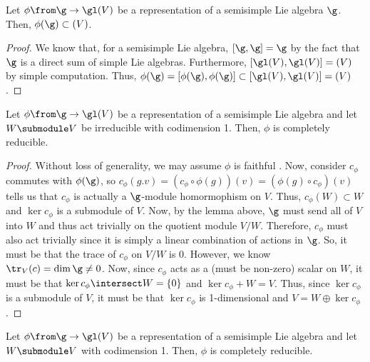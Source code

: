 \documentclass[11pt,leqno,oneside]{amsart}
\numberwithin{thm}{section}
\begin{document}
\begin{lem}\label{trivial-action-on-codim-1}
  Let \(\phi \from \g \to \gl(V)\) be a representation of a semisimple
  Lie algebra \(\g\). Then, \(\phi(\g) \subset \sl(V)\). 
\end{lem}
\begin{proof}
  We know that, for a semisimple Lie algebra, \([\g,\g] = \g\) by the
  fact that \(\g\) is a direct sum of simple Lie
  algebras. Furthermore, \([\gl(V),\gl(V)] = \sl(V)\) by simple
  computation. Thus, \(\phi(\g) = [\phi(\g), \phi(\g)] \subset
  [\gl(V),\gl(V)] = \sl(V)\). 
\end{proof}
\begin{lem}\label{baby-baby-weyl}
  Let \(\phi \from \g \to \gl(V)\) be a representation of a
  semisimple 
  Lie algebra and let \(W \submodule V\) be irreducible with
  codimension 1. Then, \(\phi\) is completely reducible.
\end{lem}
\begin{proof}
  Without loss of generality, we may assume \(\phi\) is faithful
  . Now, consider \(c_\phi\) commutes with \(\phi(\g)\), so
  \(c_\phi(g.v) = (c_\phi \circ \phi(g))(v) = (\phi(g) \circ
  c_\phi)(v)\) tells us that \(c_\phi\) is actually a \(\g\)-module
  homormophism on \(V\). Thus, \(c_\phi(W) \subset W\) and \(\ker
  c_\phi\) is a submodule of \(V\). Now, by the lemma above, \(\g\)
  must send all of \(V\) into \(W\) and thus act trivially on the
  quotient module \(V/W\). Therefore, \(c_\phi\) must also act
  trivially since it is simply a linear combination of actions in
  \(\g\). So, it must be that the trace of \(c_\phi\) on \(V/W\) is
  0. However, we know \(\tr_V(c) = \dim \g \neq 0\). Now, since
  \(c_\phi\) acts as a (must be non-zero) scalar on \(W\), it must be
  that \(\ker c_\phi \intersect W = \{0\}\) and \(\ker c_\phi + W =
  V\). Thus, since \(\ker c_\phi\) is a submodule of \(V\), it must be
  that \(\ker c_\phi\) is 1-dimensional and \(V = W \oplus \ker
  c_\phi\). 
\end{proof}
\begin{lem}\label{baby-weyl}
  Let \(\phi \from \g \to \gl(V)\) be a representation of a semisimple
  Lie algebra and let \(W \submodule V\) with codimension 1. Then,
  \(\phi\) is completely reducible. 
\end{lem}
\end{document}

